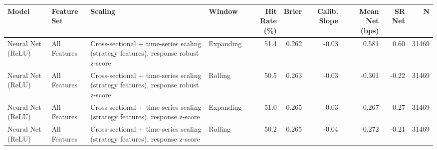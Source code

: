 \begin{tabular}{llllrrrrrr}
\toprule
Model & Feature Set & Scaling & Window & Hit Rate (\%) & Brier & Calib. Slope & Mean Net (bps) & SR Net & N \\
\midrule
Neural Net (ReLU) & All Features & Cross-sectional + time-series scaling (strategy features), response robust z-score & Expanding & 51.4 & 0.262 & -0.03 & 0.581 & 0.60 & 31469 \\
Neural Net (ReLU) & All Features & Cross-sectional + time-series scaling (strategy features), response robust z-score & Rolling & 50.5 & 0.263 & -0.03 & -0.301 & -0.22 & 31469 \\
Neural Net (ReLU) & All Features & Cross-sectional + time-series scaling (strategy features), response z-score & Expanding & 51.0 & 0.265 & -0.03 & 0.267 & 0.27 & 31469 \\
Neural Net (ReLU) & All Features & Cross-sectional + time-series scaling (strategy features), response z-score & Rolling & 50.2 & 0.265 & -0.04 & -0.272 & -0.21 & 31469 \\
\bottomrule
\end{tabular}
